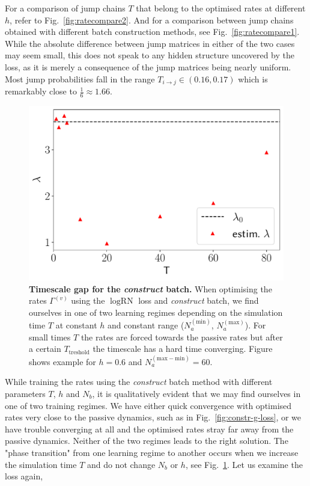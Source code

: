For a comparison of jump chains $T$ that belong to the optimised rates at different $h$, refer to Fig.~\ref{fig:ratecompare2}. And for a comparison between jump chains obtained with different batch construction methods, see Fig.~\ref{fig:ratecompare1}. While the absolute difference between jump matrices in either of the two cases may seem small, this does not speak to any hidden structure uncovered by the loss, as it is merely a consequence of the jump matrices being nearly uniform. Most jump probabilities fall in the range $T_{i \rightarrow j} \in (0.16, 0.17)$ which is remarkably close to $\frac{1}{6} \approx 1.66$.
\begin{figure}[H]
	\centering
	\includegraphics[width=0.65\linewidth]{Chapter5/Figs/Vector/Tvlamb}
	\caption[Timescale gap for the \emph{construct} batch.]{\textbf{Timescale gap for the \emph{construct} batch.} When optimising the rates $\Gamma^{(v)}$ using the $\log \text{RN}$ loss and \emph{construct} batch, we find ourselves in one of two learning regimes depending on the simulation time $T$ at constant $h$ and constant range ($N_a^{(\text{min})}$, $N_a^{(\text{max})}$). For small times $T$ the rates are forced towards the passive rates but after a certain $T_\text{treshold}$ the timescale has a hard time converging. Figure shows example for $h=0.6$ and $N_a^{(\text{max}-\text{min})} = 60$.}
	\label{fig:tvlamb}
\end{figure}
While training the rates using the \emph{construct} batch method with different parameters $T$, $h$ and $N_b$, it is qualitatively evident that we may find ourselves in one of two training regimes. We have either quick convergence with optimised rates very close to the passive dynamics, such as in Fig.~\ref{fig:constr-g-loss}, or we have trouble converging at all and the optimised rates stray far away from the passive dynamics. Neither of the two regimes leads to the right solution. The "phase transition" from one learning regime to another occurs when we increase the simulation time $T$ and do not change $N_b$ or $h$, see Fig.~\ref{fig:tvlamb}. Let us examine the loss again,
